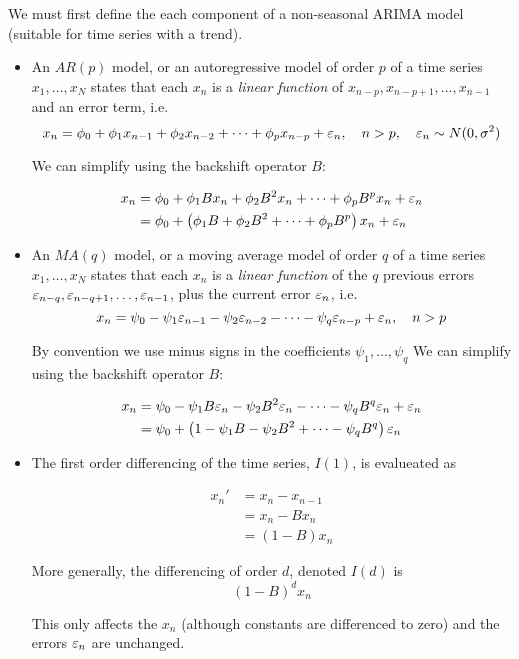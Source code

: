 We must first define the each component of a non-seasonal ARIMA model (suitable for time series with a trend).

\begin{itemize}
\item An $AR(p)$ model, or an autoregressive model of order $p$ of a time series $x_1,\dots,x_N$ states that each $x_n$ is a \textit{linear function} of $x_{n-p},x_{n-p+1},\dots,x_{n-1}$ and an error term, i.e. 
$$x_n= \phi_0+\phi_1 x_{n-1}+\phi_2 x_{n-2} +\dots + \phi_p x_{n-p}+\varepsilon_n,\quad n>p,\quad \varepsilon_n\sim N(0,\sigma^2)$$

We can simplify using the backshift operator $B$:

\begin{align}
x_n
&= \phi_0+\phi_1 Bx_n+\phi_2 B^2x_n +\dots + \phi_p B^px_n +\varepsilon_n\nonumber \\
&= \phi_0+\left(\phi_1 B+\phi_2 B^2 +\dots + \phi_p B^p\right)x_n +\varepsilon_n
\end{align}

\item An $MA(q)$ model, or a moving average model of order $q$ of a time series $x_1,\dots,x_N$ states that each $x_n$ is a \textit{linear function} of the $q$ previous errors $\varepsilon_{n-q},\varepsilon_{n-q+1},\dots,\varepsilon_{n-1}$, plus the current error $\varepsilon_n$, i.e. 
$$x_n= \psi_0-\psi_1 \varepsilon_{n-1}-\psi_2 \varepsilon_{n-2} -\dots - \psi_q \varepsilon_{n-p}+\varepsilon_n,\quad n>p$$

By convention we use minus signs in the coefficients $\psi_1,\dots,\psi_q$
We can simplify using the backshift operator $B$:

\begin{align}
x_n
&= \psi_0-\psi_1 B\varepsilon_n-\psi_2 B^2\varepsilon_n -\dots - \psi_q B^q\varepsilon_n + \varepsilon_n \nonumber \\
&= \psi_0+\left(1-\psi_1 B-\psi_2 B^2 +\dots - \psi_q B^q\right)\varepsilon_n 
\end{align}

\item The first order differencing of the time series, $I(1)$, is evalueated as 

\begin{align}
x_n'
&=x_n-x_{n-1}\nonumber \\
&=x_n-Bx_n \nonumber \\
&=\left(1-B\right)x_n
\end{align}

More generally, the differencing of order $d$, denoted $I(d)$ is 
$$(1-B)^d x_n$$

This only affects the $x_n$ (although constants are differenced to zero) and the errors $\varepsilon_n$ are unchanged.
\end{itemize}

